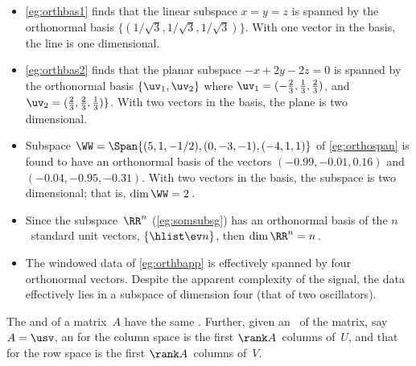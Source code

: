 \begin{example} \label{eg:}
\begin{itemize}
\item \autoref{eg:orthbas1} finds that the linear subspace \(x=y=z\) is spanned by the orthonormal basis \(\{(1/{\sqrt3},1/{\sqrt3},1/{\sqrt3})\}\).  
With one vector in the basis, the line is one dimensional.

\item \autoref{eg:orthbas2} finds that the planar subspace \(-x+2y-2z=0\) is spanned by the orthonormal basis \(\{\uv_1,\uv_2\}\) where \(\uv_1=(-\frac23,\frac13,\frac23)\), and \(\uv_2=(\frac23,\frac23,\frac13)\}\).  
With two vectors in the basis, the plane is two dimensional.

\item  Subspace \(\WW=\Span\{(5,1,-1/2),(0,-3,-1),(-4,1,1)\}\) of \autoref{eg:orthospan} is found to have an orthonormal basis of the vectors  \((-0.99,-0.01,0.16)\) and \((-0.04,-0.95,-0.31)\).
With two vectors in the basis, the subspace is two dimensional; that is, \(\dim\WW=2\)\,.

\item Since the subspace~\(\RR^n\) (\autoref{eg:somsubsg}) has an orthonormal basis of the \(n\)~standard unit vectors, \(\{\hlist\ev n\}\), then  \(\dim\RR^n=n\)\,.

\item The  windowed data of \autoref{eg:orthbapp} is effectively spanned by four orthonormal vectors.  Despite the apparent complexity of the signal, the data effectively lies in a subspace of dimension four (that of two oscillators).
\end{itemize}
\end{example}


\begin{theorem} \label{thm:rowcolD} 
The  and  of a matrix~\(A\) have the same .
Further, given an \svd\ of the matrix, say \(A=\usv\), an  for the column space is the first \(\rank A\)~columns of~\(U\), and that for the row space is the first \(\rank A\)~columns of~\(V\).
\end{theorem}

